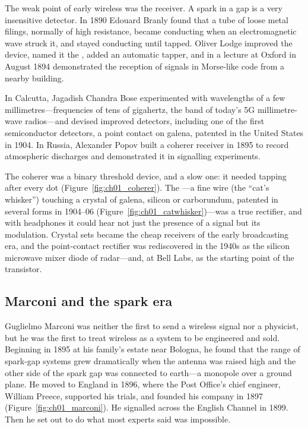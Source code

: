 The weak point of early wireless was the receiver. A spark in a gap is a very insensitive detector.
In 1890 Edouard Branly found that a tube of loose metal filings, normally of high resistance, became
conducting when an electromagnetic wave struck it, and stayed conducting until tapped. Oliver Lodge
improved the device, named it the , added an automatic tapper, and in a lecture at
Oxford in August 1894 demonstrated the reception of signals in Morse-like code from a nearby building.


In Calcutta, Jagadish Chandra Bose experimented with wavelengths of a few millimetres---frequencies of
tens of gigahertz, the band of today's 5G millimetre-wave radios---and devised improved detectors,
including one of the first semiconductor detectors, a point contact on galena, patented in the United
States in 1904. In Russia, Alexander Popov built a coherer receiver in 1895 to record atmospheric
discharges and demonstrated it in signalling experiments.

The coherer was a binary threshold device, and a slow one: it needed tapping after every dot
(Figure~\ref{fig:ch01_coherer}). The ---a fine wire (the ``cat's whisker'')
touching a crystal of galena, silicon or carborundum, patented in several forms in 1904--06
(Figure~\ref{fig:ch01_catwhisker})---was a true rectifier, and with headphones it could hear not just
the presence of a signal but its modulation. Crystal sets became the cheap receivers of the early
broadcasting era, and the point-contact rectifier was rediscovered in the 1940s as the silicon
microwave mixer diode of radar---and, at Bell Labs, as the starting point of the transistor.

\subsection{Marconi and the spark era}

Guglielmo Marconi was neither the first to send a wireless signal nor a physicist, but he was the
first to treat wireless as a system to be engineered and sold. Beginning in 1895 at his family's
estate near Bologna, he found that the range of spark-gap systems grew dramatically when the antenna
was raised high and the other side of the spark gap was connected to earth---a monopole over a ground
plane. He moved to England in 1896, where the Post Office's chief engineer, William Preece, supported
his trials, and founded his company in 1897 (Figure~\ref{fig:ch01_marconi}). He signalled across the
English Channel in 1899. Then he set out to do what most experts said was impossible.

